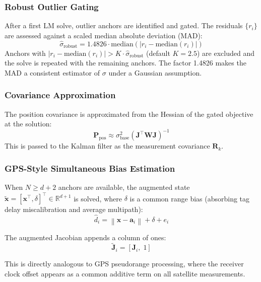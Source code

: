\documentclass[11pt,a4paper]{article}
\newcommand{\vect}[1]{\bm{#1}}
\newcommand{\mat}[1]{\mathbf{#1}}
\newcommand{\norm}[1]{\left\|#1\right\|}
\newcommand{\abs}[1]{\left|#1\right|}
\newcommand{\Trans}{^{\top}}
\newcommand{\R}{\mathbb{R}}
\begin{document}
\subsubsection{Robust Outlier Gating}

After a first LM solve, outlier anchors are identified and gated. The residuals $\{r_i\}$ are assessed against a scaled median absolute deviation (MAD):
\begin{equation}
\hat{\sigma}_\text{robust} = 1.4826 \cdot \text{median}\left(\abs{r_i - \text{median}(r_i)}\right)
\end{equation}
Anchors with $\abs{r_i - \text{median}(r_i)} > K \cdot \hat{\sigma}_\text{robust}$ (default $K = 2.5$) are excluded and the solve is repeated with the remaining anchors. The factor 1.4826 makes the MAD a consistent estimator of $\sigma$ under a Gaussian assumption.

\subsubsection{Covariance Approximation}

The position covariance is approximated from the Hessian of the gated objective at the solution:
\begin{equation}
\mat{P}_\text{pos} \approx \sigma_\text{base}^2 \left(\mat{J}\Trans \mat{W} \mat{J}\right)^{-1}
\label{eq:cov}
\end{equation}
This is passed to the Kalman filter as the measurement covariance $\mat{R}_k$.

\subsubsection{GPS-Style Simultaneous Bias Estimation}

When $N \geq d+2$ anchors are available, the augmented state $\tilde{\vect{x}} = [\vect{x}\Trans, \delta]\Trans \in \R^{d+1}$ is solved, where $\delta$ is a common range bias (absorbing tag delay miscalibration and average multipath):
\begin{equation}
\hat{d}_i = \norm{\vect{x} - \vect{a}_i} + \delta + e_i
\end{equation}

The augmented Jacobian appends a column of ones:
\begin{equation}
\tilde{\mat{J}}_i = \left[\mat{J}_i,\; 1\right]
\label{eq:jacaug}
\end{equation}

This is directly analogous to GPS pseudorange processing, where the receiver clock offset appears as a common additive term on all satellite measurements.
\end{document}
